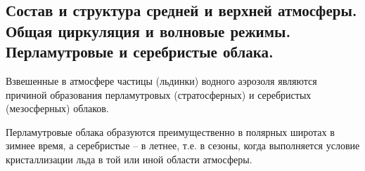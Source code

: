 \subsection{Состав и структура средней и верхней атмосферы. Общая циркуляция и волновые режимы. Перламутровые и серебристые облака.}
Взвешенные в атмосфере частицы (льдинки) водного аэрозоля являются причиной образования перламутровых (стратосферных) и серебристых (мезосферных) облаков.

Перламутровые облака образуются преимущественно в полярных широтах в зимнее время, а серебристые -- в летнее, т.е. в сезоны, когда выполняется условие кристаллизации льда в той или иной области атмосферы.
